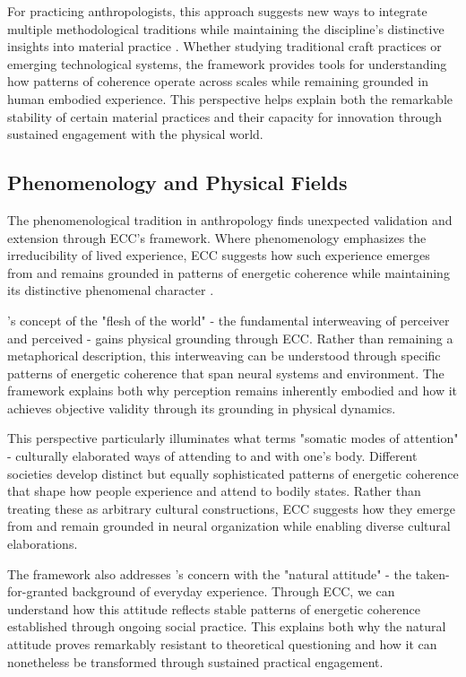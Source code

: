 For practicing anthropologists, this approach suggests new ways to integrate multiple methodological traditions while maintaining the discipline's distinctive insights into material practice \cite{warnier2001praxeological}. Whether studying traditional craft practices or emerging technological systems, the framework provides tools for understanding how patterns of coherence operate across scales while remaining grounded in human embodied experience. This perspective helps explain both the remarkable stability of certain material practices and their capacity for innovation through sustained engagement with the physical world.

\subsection{Phenomenology and Physical Fields}

The phenomenological tradition in anthropology finds unexpected validation and extension through ECC's framework. Where phenomenology emphasizes the irreducibility of lived experience, ECC suggests how such experience emerges from and remains grounded in patterns of energetic coherence while maintaining its distinctive phenomenal character \cite{merleau1968visible}.

\cite{merleau1968visible}'s concept of the "flesh of the world" - the fundamental interweaving of perceiver and perceived - gains physical grounding through ECC. Rather than remaining a metaphorical description, this interweaving can be understood through specific patterns of energetic coherence that span neural systems and environment. The framework explains both why perception remains inherently embodied and how it achieves objective validity through its grounding in physical dynamics.

This perspective particularly illuminates what \cite{csordas1993somatic} terms "somatic modes of attention" - culturally elaborated ways of attending to and with one's body. Different societies develop distinct but equally sophisticated patterns of energetic coherence that shape how people experience and attend to bodily states. Rather than treating these as arbitrary cultural constructions, ECC suggests how they emerge from and remain grounded in neural organization while enabling diverse cultural elaborations.

The framework also addresses \cite{schutz1945multiple}'s concern with the "natural attitude" - the taken-for-granted background of everyday experience. Through ECC, we can understand how this attitude reflects stable patterns of energetic coherence established through ongoing social practice. This explains both why the natural attitude proves remarkably resistant to theoretical questioning and how it can nonetheless be transformed through sustained practical engagement.

